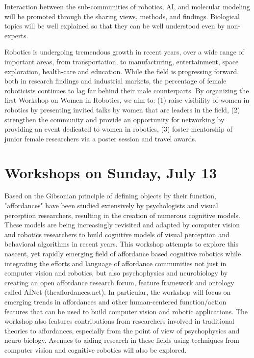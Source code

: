 \begin{spacing}{1.0}
{Interaction between the sub-communities of robotics, AI, and molecular modeling will be promoted through the sharing views, methods, and findings. Biological topics will be well explained so that they can be well understood even by non-experts.
}



{
Robotics is undergoing tremendous growth in recent years, over a wide range of important areas, from transportation, to manufacturing, entertainment, space exploration, health-care and education. While the field is progressing forward, both in research findings and industrial markets, the percentage of female roboticists continues to lag far behind their male counterparts. By organizing the first Workshop on Women in Robotics, we aim to: (1) raise visibility of women in robotics by presenting invited talks by women that are leaders in the field, (2) strengthen the community and provide an opportunity for networking by providing an event dedicated to women in robotics, (3) foster mentorship of junior female researchers via a poster session and travel awards.
}


\chapter{Workshops on Sunday, July 13}
\vspace*{-1.0cm}

{
Based on the Gibsonian principle of defining objects by their function, "affordances" have been studied extensively by psychologists and visual perception researchers, resulting in the creation of numerous cognitive models. These models are being increasingly revisited and adapted by computer vision and robotics researchers to build cognitive models of visual perception and behavioral algorithms in recent years. This workshop attempts to explore this nascent, yet rapidly emerging field of affordance based cognitive robotics while integrating the efforts and language of affordance communities not just in computer vision and robotics, but also psychophysics and neurobiology by creating an open affordance research forum, feature framework and ontology called AfNet (theaffordances.net). In particular, the workshop will focus on emerging trends in affordances and other human-centered function/action features that can be used to build computer vision and robotic applications. The workshop also features contributions from researchers involved in traditional theories to affordances, especially from the point of view of psychophysics and neuro-biology. Avenues to aiding research in these fields using techniques from computer vision and cognitive robotics will also be explored.

}
\end{spacing}
